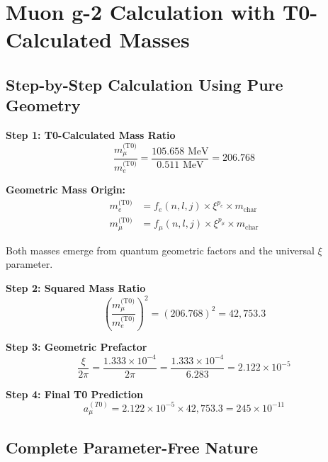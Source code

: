 \documentclass[12pt,a4paper]{article}
\numberwithin{equation}{section}
\begin{document}
	\section{Muon g-2 Calculation with T0-Calculated Masses}
	
	\subsection{Step-by-Step Calculation Using Pure Geometry}
	
	\textbf{Step 1: T0-Calculated Mass Ratio}
	\begin{equation}
		\frac{m_\mu^{\text{(T0)}}}{m_e^{\text{(T0)}}} = \frac{105.658 \text{ MeV}}{0.511 \text{ MeV}} = 206.768
	\end{equation}
	
	\begin{t0calculation}
		\textbf{Geometric Mass Origin:}
		\begin{align}
			m_e^{\text{(T0)}} &= f_e(n,l,j) \times \xi^{p_e} \times m_{\text{char}}\\
			m_\mu^{\text{(T0)}} &= f_\mu(n,l,j) \times \xi^{p_\mu} \times m_{\text{char}}
		\end{align}
		
		Both masses emerge from quantum geometric factors and the universal $\xi$ parameter.
	\end{t0calculation}
	
	\textbf{Step 2: Squared Mass Ratio}
	\begin{equation}
		\left(\frac{m_\mu^{\text{(T0)}}}{m_e^{\text{(T0)}}}\right)^2 = (206.768)^2 = 42{,}753.3
	\end{equation}
	
	\textbf{Step 3: Geometric Prefactor}
	\begin{equation}
		\frac{\xi}{2\pi} = \frac{1.333 \times 10^{-4}}{2\pi} = \frac{1.333 \times 10^{-4}}{6.283} = 2.122 \times 10^{-5}
	\end{equation}
	
	\textbf{Step 4: Final T0 Prediction}
	\begin{equation}
		a_\mu^{(T0)} = 2.122 \times 10^{-5} \times 42{,}753.3 = 245 \times 10^{-11}
	\end{equation}
	
	\subsection{Complete Parameter-Free Nature}
	
\end{document}
